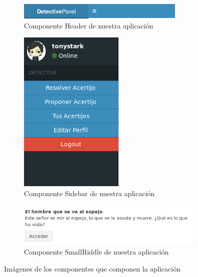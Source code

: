 \begin{figure}[hbtp] \centering
\begin{subfigure}{.6\textwidth}
     \centerline{\includegraphics[width=8cm]{figuras/header.png}}
    \caption{Componente Header de nuestra aplicación}
    \label{fig::header}
\end{subfigure}
\begin{subfigure}{.6\textwidth}
    \centerline{\includegraphics[width=5cm]{figuras/sidebar.png}}
    \caption{Componente Sidebar de nuestra aplicación}
    \label{fig::sidebar}
\end{subfigure}

\begin{subfigure}{.6\textwidth}
     \centerline{\includegraphics[width=9cm]{figuras/smallriddle.png}}
    \caption{Componente SmallRiddle de nuestra aplicación}
    \label{fig::smallriddle}
\end{subfigure}
\caption{Imágenes de los componentes que componen la aplicación}
\label{fig::componentes}
\end{figure}


